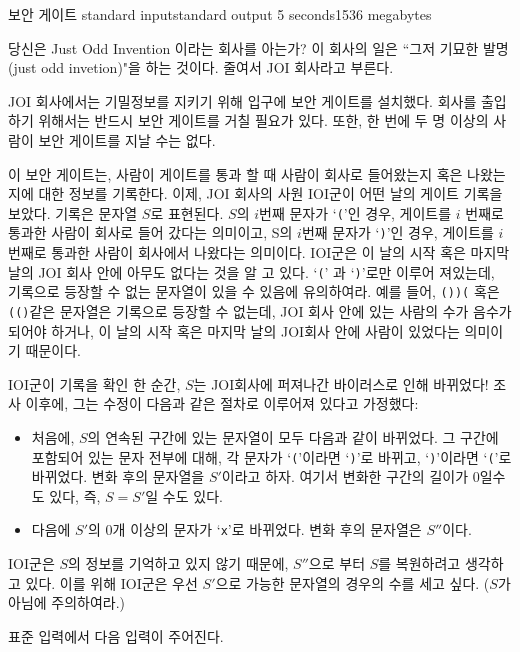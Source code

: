 \begin{problem}{보안 게이트}
	{standard input}{standard output}
	{5 seconds}{1536 megabytes}{}
	
	당신은 Just Odd Invention 이라는 회사를 아는가? 이 회사의 일은 ``그저 기묘한 발명 (just odd invetion)"을 하는 것이다. 줄여서 JOI 회사라고 부른다.
	
	JOI 회사에서는 기밀정보를 지키기 위해 입구에 보안 게이트를 설치했다. 회사를 출입하기 위해서는 반드시 보안 게이트를 거칠 필요가 있다. 또한, 한 번에 두 명 이상의 사람이 보안 게이트를 지날 수는 없다.
	
	이 보안 게이트는, 사람이 게이트를 통과 할 때 사람이 회사로 들어왔는지 혹은 나왔는지에 대한 정보를 기록한다. 이제, JOI 회사의 사원 IOI군이 어떤 날의 게이트 기록을 보았다. 기록은 문자열 $S$로 표현된다. $S$의 $i$번째 문자가 `\texttt{(}'인 경우, 게이트를 $i$ 번째로 통과한 사람이 회사로 들어 갔다는 의미이고, S의 $i$번째 문자가 `\texttt{)}'인 경우, 게이트를 $i$ 번째로 통과한 사람이 회사에서 나왔다는 의미이다. IOI군은 이 날의 시작 혹은 마지막 날의 JOI 회사 안에 아무도 없다는 것을 알 고 있다. `\texttt{(}' 과 `\texttt{)}'로만 이루어 져있는데, 기록으로 등장할 수 없는 문자열이 있을 수 있음에 유의하여라. 예를 들어, \texttt{())(} 혹은 \texttt{(()}같은 문자열은 기록으로 등장할 수 없는데, JOI 회사 안에 있는 사람의 수가 음수가 되어야 하거나, 이 날의 시작 혹은 마지막 날의 JOI회사 안에 사람이 있었다는 의미이기 때문이다.
	
	IOI군이 기록을 확인 한 순간, $S$는 JOI회사에 퍼져나간 바이러스로 인해 바뀌었다! 조사 이후에, 그는 수정이 다음과 같은 절차로 이루어져 있다고 가정했다:
	
	\begin{itemize}
		\item 처음에, $S$의 연속된 구간에 있는 문자열이 모두 다음과 같이 바뀌었다. 그 구간에 포함되어 있는 문자 전부에 대해, 각 문자가 `\texttt{(}'이라면 `\texttt{)}'로 바뀌고, `\texttt{)}'이라면 `\texttt{(}'로 바뀌었다. 변화 후의 문자열을 $S'$이라고 하자. 여기서 변화한 구간의 길이가 0일수도 있다, 즉, $S=S'$일 수도 있다.
		\item 다음에 $S'$의 0개 이상의 문자가 `\texttt{x}'로 바뀌었다. 변화 후의 문자열은 $S''$이다.
	\end{itemize}
	
	IOI군은 $S$의 정보를 기억하고 있지 않기 때문에, $S''$으로 부터 $S$를 복원하려고 생각하고 있다. 이를 위해 IOI군은 우선 $S'$으로 가능한 문자열의 경우의 수를 세고 싶다. ($S$가 아님에 주의하여라.)
	
	\InputFile
	
	표준 입력에서 다음 입력이 주어진다.
	

\end{problem}
